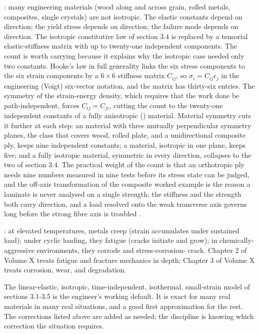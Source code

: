 : many engineering materials (wood along and
across grain, rolled metals, composites, single crystals) are not
isotropic. The elastic constants depend on direction; the yield
stress depends on direction; the failure mode depends on direction.
The isotropic constitutive law of section 3.4 is replaced by a
tensorial elastic-stiffness matrix with up to twenty-one independent
components. The count is worth carrying because it explains why the
isotropic case needed only two constants. Hooke's law in full generality
links the six stress components to the six strain components by a
$6\times 6$ stiffness matrix $C_{ij}$, so $\sigma_i = C_{ij}\epsilon_j$
in the engineering (Voigt) six-vector notation, and the matrix has
thirty-six entries. The symmetry of the strain-energy density, which
requires that the work done be path-independent, forces $C_{ij} =
C_{ji}$, cutting the count to the twenty-one independent constants of a
fully anisotropic () material. Material symmetry cuts
it further at each step: an  material with three
mutually perpendicular symmetry planes, the class that covers wood, rolled
plate, and a unidirectional composite ply, keeps nine independent
constants; a  material, isotropic in one
plane, keeps five; and a fully isotropic material, symmetric in every
direction, collapses to the two of section 3.4. The practical weight of
the count is that an orthotropic ply needs nine numbers measured in nine
tests before its stress state can be judged, and the off-axis
transformation of the composite worked example is the reason a laminate is
never analysed on a single strength: the stiffness and the strength both
carry direction, and a load resolved onto the weak transverse axis governs
long before the strong fibre axis is troubled \cite[ch.~5]{text:chawla-composites}.

: at elevated temperatures, metals
creep (strain accumulates under sustained load); under cyclic
loading, they fatigue (cracks initiate and grow); in
chemically-aggressive environments, they corrode and stress-corrosion-
crack. Chapter 2 of Volume X treats fatigue and fracture mechanics
in depth; Chapter 3 of Volume X treats corrosion, wear, and
degradation.

The linear-elastic, isotropic, time-independent, isothermal,
small-strain model of sections 3.1-3.5 is the engineer's working
default. It is exact for many real materials in many real situations,
and a good first approximation for the rest. The corrections listed
above are added as needed; the discipline is knowing which correction
the situation requires.


